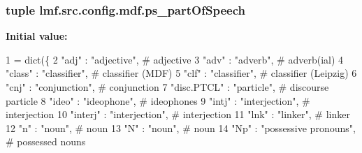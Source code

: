 \hypertarget{namespacelmf_1_1src_1_1config_1_1mdf_a1e76a452fc77f05851e4369134f5980b}{
\subsubsection[{ps\+\_\+part\+Of\+Speech}]{\setlength{\rightskip}{0pt plus 5cm}tuple lmf.\+src.\+config.\+mdf.\+ps\+\_\+part\+Of\+Speech}}\label{namespacelmf_1_1src_1_1config_1_1mdf_a1e76a452fc77f05851e4369134f5980b}
{\bfseries Initial value\+:}
\begin{DoxyCode}
1 = dict(\{
2     \textcolor{stringliteral}{"adj"}           : \textcolor{stringliteral}{"adjective"},                  \textcolor{comment}{# adjective}
3     \textcolor{stringliteral}{"adv"}           : \textcolor{stringliteral}{"adverb"},                     \textcolor{comment}{# adverb(ial)}
4     \textcolor{stringliteral}{"class"}         : \textcolor{stringliteral}{"classifier"},                 \textcolor{comment}{# classifier (MDF)}
5     \textcolor{stringliteral}{"clf"}           : \textcolor{stringliteral}{"classifier"},                 \textcolor{comment}{# classifier (Leipzig)}
6     \textcolor{stringliteral}{"cnj"}           : \textcolor{stringliteral}{"conjunction"},                \textcolor{comment}{# conjunction}
7     \textcolor{stringliteral}{"disc.PTCL"}     : \textcolor{stringliteral}{"particle"},                   \textcolor{comment}{# discourse particle}
8     \textcolor{stringliteral}{"ideo"}          : \textcolor{stringliteral}{"ideophone"},                  \textcolor{comment}{# ideophones}
9     \textcolor{stringliteral}{"intj"}          : \textcolor{stringliteral}{"interjection"},               \textcolor{comment}{# interjection}
10     \textcolor{stringliteral}{"interj"}        : \textcolor{stringliteral}{"interjection"},               \textcolor{comment}{# interjection}
11     \textcolor{stringliteral}{"lnk"}           : \textcolor{stringliteral}{"linker"},                     \textcolor{comment}{# linker}
12     \textcolor{stringliteral}{"n"}             : \textcolor{stringliteral}{"noun"},                       \textcolor{comment}{# noun}
13     \textcolor{stringliteral}{"N"}             : \textcolor{stringliteral}{"noun"},                       \textcolor{comment}{# noun}
14     \textcolor{stringliteral}{"Np"}            : \textcolor{stringliteral}{"possessive pronouns"},        \textcolor{comment}{# possessed nouns}

\end{DoxyCode}
